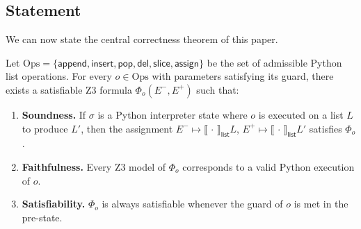 \documentclass[11pt]{article}
\newcommand{\MutApp}{\ensuremath{\mathsf{append}}}
\newcommand{\MutIns}{\ensuremath{\mathsf{insert}}}
\newcommand{\MutPop}{\ensuremath{\mathsf{pop}}}
\newcommand{\MutDel}{\ensuremath{\mathsf{del}}}
\newcommand{\MutSlice}{\ensuremath{\mathsf{slice}}}
\newcommand{\MutAssign}{\ensuremath{\mathsf{assign}}}
\newcommand{\prestate}[1]{#1^{-}}
\newcommand{\poststate}[1]{#1^{+}}
\newcommand{\seqsem}{\llbracket\,\cdot\,\rrbracket_{\mathsf{list}}}
\begin{document}
\subsection{Statement}

We can now state the central correctness theorem of this paper.

\begin{theorem}\label{thm:mutsound}
Let $\mathrm{Ops} = \{\MutApp, \MutIns, \MutPop, \MutDel, \MutSlice, \MutAssign\}$
be the set of admissible Python list operations.  For every
$o \in \mathrm{Ops}$ with parameters satisfying its guard, there exists a
satisfiable Z3 formula $\Phi_o(\prestate{E}, \poststate{E})$ such that:
\begin{enumerate}[label=(\roman*),nosep]
  \item \textbf{Soundness.} If $\sigma$ is a Python interpreter state where
        $o$ is executed on a list $L$ to produce $L'$, then the assignment
        $\prestate{E} \mapsto \seqsem{L}$,
        $\poststate{E} \mapsto \seqsem{L'}$
        satisfies $\Phi_o$.
  \item \textbf{Faithfulness.} Every Z3 model of $\Phi_o$ corresponds to
        a valid Python execution of $o$.
  \item \textbf{Satisfiability.} $\Phi_o$ is always satisfiable whenever
        the guard of $o$ is met in the pre-state.
\end{enumerate}
\end{theorem}
\end{document}
